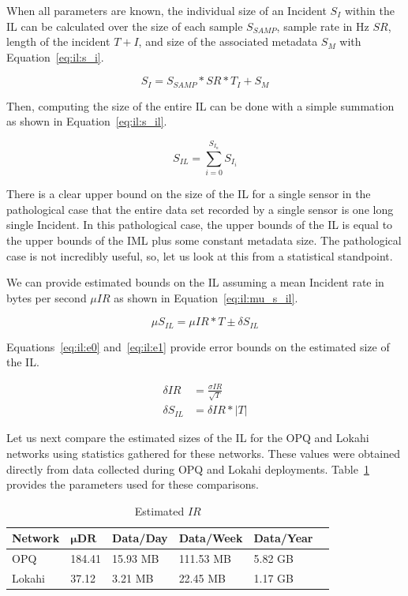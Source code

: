 When all parameters are known, the individual size of an Incident $S_{I}$ within the IL can be calculated over the size of each sample $S_{SAMP}$, sample rate in Hz $SR$, length of the incident $T+{I}$, and size of the associated metadata $S_{M}$ with Equation~\ref{eq:il:s_i}.

\begin{equation}\label{eq:il:s_i}
	S_{I} = S_{SAMP} * SR * T_{I} + S_{M}
\end{equation}

Then, computing the size of the entire IL can be done with a simple summation as shown in Equation~\ref{eq:il:s_il}.

\begin{equation}\label{eq:il:s_il}
	S_{IL} = \sum_{i=0}^{S_{I_{n}}} S_{I_{i}}
\end{equation}

There is a clear upper bound on the size of the IL for a single sensor in the pathological case that the entire data set recorded by a single sensor is one long single Incident. In this pathological case, the upper bounds of the IL is equal to the upper bounds of the IML plus some constant metadata size. The pathological case is not incredibly useful, so, let us look at this from a statistical standpoint.

We can provide estimated bounds on the IL assuming a mean Incident rate in bytes per second $\mu IR$ as shown in Equation~\ref{eq:il:mu_s_il}.

\begin{equation}\label{eq:il:mu_s_il}
 \mu S_{IL} = \mu IR * T \pm \delta S_{IL}
\end{equation}

Equations~\ref{eq:il:e0} and~\ref{eq:il:e1} provide error bounds on the estimated size of the IL\@.

\begin{align}
	\delta IR &= \frac{\sigma IR}{\sqrt{T}} \label{eq:il:e0} \\
	\delta S_{IL} &= \delta IR * |T| \label{eq:il:e1}
\end{align}

Let us next compare the estimated sizes of the IL for the OPQ and Lokahi networks using statistics gathered for these networks. These values were obtained directly from data collected during OPQ and Lokahi deployments. Table~\ref{table:estimated_mu_ir} provides the parameters used for these comparisons.

\begin{table}[H]
	\centering
	\caption{Estimated $IR$}
	\begin{tabularx}{\textwidth}{llllll}
		\toprule
		\textbf{Network} & $\bm{\mu DR}$ & \textbf{Data/Day} & \textbf{Data/Week} & \textbf{Data/Year} \\
		\midrule
		OPQ & 184.41 & 15.93 MB & 111.53 MB & 5.82 GB \\
		Lokahi & 37.12 & 3.21 MB & 22.45 MB & 1.17 GB \\
		\bottomrule
	\end{tabularx}
	\label{table:estimated_mu_ir}
\end{table}

